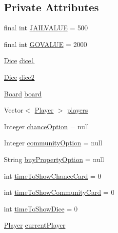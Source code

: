 \subsection*{Private Attributes}
\begin{DoxyCompactItemize}
\item 
final int \hyperlink{class_monopoly_1_1_logic_1_1_game_a0e9301a2ac7d3af022ec8f0846e3f96a}{J\+A\+I\+L\+V\+A\+L\+UE} = 500
\item 
final int \hyperlink{class_monopoly_1_1_logic_1_1_game_a56756d9c96a11f599e4abaed874b2cf9}{G\+O\+V\+A\+L\+UE} = 2000
\item 
\hyperlink{class_monopoly_1_1_logic_1_1_dice}{Dice} \hyperlink{class_monopoly_1_1_logic_1_1_game_ade748d7293525398b9c16959dbb5dd30}{dice1}
\item 
\hyperlink{class_monopoly_1_1_logic_1_1_dice}{Dice} \hyperlink{class_monopoly_1_1_logic_1_1_game_af248656616e885a175559dc3a1131478}{dice2}
\item 
\hyperlink{class_monopoly_1_1_logic_1_1_board}{Board} \hyperlink{class_monopoly_1_1_logic_1_1_game_ac8c4913448cdb3e37b3ac102e9b115d2}{board}
\item 
Vector$<$ \hyperlink{class_monopoly_1_1_logic_1_1_player}{Player} $>$ \hyperlink{class_monopoly_1_1_logic_1_1_game_abc3b3d5d0514ad27889ffd8f80cb58e9}{players}
\item 
Integer \hyperlink{class_monopoly_1_1_logic_1_1_game_a31a86909fac3b9813f640e1bde0dca67}{chance\+Option} = null
\item 
Integer \hyperlink{class_monopoly_1_1_logic_1_1_game_af554ecfbf29629088223f2b39fd30957}{community\+Option} = null
\item 
String \hyperlink{class_monopoly_1_1_logic_1_1_game_abb784248ea530aa3048e3d0bb446bc1a}{buy\+Property\+Option} = null
\item 
int \hyperlink{class_monopoly_1_1_logic_1_1_game_ab18b820c155583ca527bf0af30a71d59}{time\+To\+Show\+Chance\+Card} = 0
\item 
int \hyperlink{class_monopoly_1_1_logic_1_1_game_afb4e4a1c8da73de664522a9424178948}{time\+To\+Show\+Community\+Card} = 0
\item 
int \hyperlink{class_monopoly_1_1_logic_1_1_game_a3fa0279ba0d3d1312e9f2a11dea01b87}{time\+To\+Show\+Dice} = 0
\item 
\hyperlink{class_monopoly_1_1_logic_1_1_player}{Player} \hyperlink{class_monopoly_1_1_logic_1_1_game_abee6578b24832cabdf7339d4505b1fc1}{current\+Player}
\end{DoxyCompactItemize}


